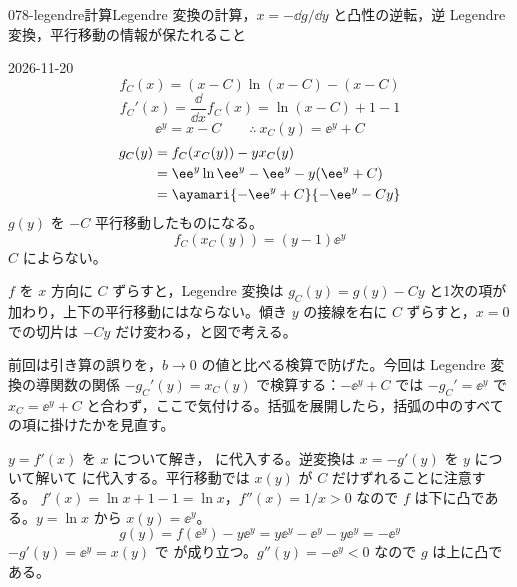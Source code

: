 \documentclass[uplatex,dvipdfmx,a4paper,11pt]{jsarticle}
\begin{document}
\begin{mondai}{078-legendre}{計算}{Legendre 変換の計算，$x = -\dd g/\dd y$ と凸性の逆転，逆 Legendre 変換，平行移動の情報が保たれること}
\begin{kotaeutsushi}{2026-11-20}
\[ f_{C}(x)=(x-C)\ln(x-C)-(x-C) \]
\[ f_{C}'(x)=\frac{\dd}{\dd x}f_{C}(x)=\ln(x-C)+1-1 \]
\[ \ee^{y}=x-C \qquad \therefore\ x_{C}(y)=\ee^{y}+C \]
\begin{align*}
g_{C}(y)&=f_{C}(x_{C}(y))-yx_{C}(y)\\
&=\ee^{y}\ln\ee^{y}-\ee^{y}-y(\ee^{y}+C)\\
&=\ayamari{-\ee^{y}+C}{-\ee^{y}-Cy}
\end{align*}
$g(y)$ を $-C$ 平行移動したものになる。
\[ f_{C}(x_{C}(y))=(y-1)\ee^{y} \]
$C$ によらない。
\end{kotaeutsushi}
\begin{kizuki}
\item $f$ を $x$ 方向に $C$ ずらすと，Legendre 変換は $g_{C}(y)=g(y)-Cy$ と1次の項が加わり，上下の平行移動にはならない。傾き $y$ の接線を右に $C$ ずらすと，$x=0$ での切片は $-Cy$ だけ変わる，と図で考える。
\item {} 前回は引き算の誤りを，$b\to0$ の値と比べる検算で防げた。今回は Legendre 変換の導関数の関係 $-g_{C}'(y)=x_{C}(y)$ で検算する：$-\ee^{y}+C$ では $-g_{C}'=\ee^{y}$ で $x_{C}=\ee^{y}+C$ と合わず，ここで気付ける。括弧を展開したら，括弧の中のすべての項に掛けたかを見直す。
\end{kizuki}
\begin{tadashii}
\houshin $y = f'(x)$ を $x$ について解き， に代入する。逆変換は $x = -g'(y)$ を $y$ について解いて  に代入する。平行移動では $x(y)$ が $C$ だけずれることに注意する。
\keisan {} $f'(x) = \ln x + 1 - 1 = \ln x$，$f''(x) = 1/x > 0$ なので $f$ は下に凸である。$y = \ln x$ から $x(y) = \ee^{y}$。
\[ g(y) = f(\ee^{y}) - y\ee^{y} = y\ee^{y} - \ee^{y} - y\ee^{y} = -\ee^{y} \]
 $-g'(y) = \ee^{y} = x(y)$ で  が成り立つ。$g''(y) = -\ee^{y} < 0$ なので $g$ は上に凸である。


\end{tadashii}
\end{mondai}
\end{document}
